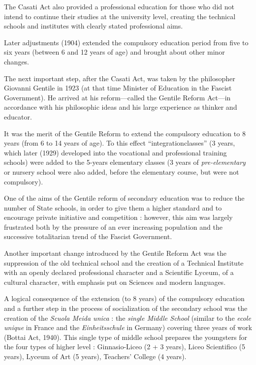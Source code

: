 The Casati Act also provided a professional education for those who did not intend to continue their studies at the university level, creating the technical schools and institutes with clearly stated professional aims.

Later adjustments (1904) extended the compulsory education period from five to six years (between 6 and 12 years of age) and brought about other minor changes.

The next important step, after the Casati Act, was taken by the philosopher Giovanni Gentile in 1923 (at that time Minister of Education in the Fascist Government). He arrived at his reform---called the Gentile Reform Act---in accordance with his philosophic ideas and his large experience as thinker and educator.

It was the merit of the Gentile Reform to extend the compulsory education to 8 years (from 6 to 14 years of age). To this effect ``integration\pageoriginale classes'' (3 years, which later (1929) developed into the vocational and professional training schools) were added to the 5-years elementary classes (3 years of {\em pre-elementary} or nursery school were also added, before the elementary course, but were not compulsory).

One of the aims of the Gentile reform of secondary education was to reduce the number of State schools, in order to give them a higher standard and to encourage private initiative and competition : however, this aim was largely frustrated both by the pressure of an ever increasing population and the successive totalitarian trend of the Fascist Government.

Another important change introduced by the Gentile Reform Act was the suppression of the old technical school and the creation of a Technical Institute with an openly declared professional character and a Scientific Lyceum, of a cultural character, with emphasis put on Sciences and modern languages.

A logical consequence of the extension (to 8 years) of the compulsory education and a further step in the process of socialization of the secondary school was the creation of the {\em Scuola Meida unica} : the {\em single Middle School} (similar to the {\em ecole unique} in France and the {\em Einheitsschule} in Germany) covering three years of work (Bottai Act, 1940). This single type of middle school prepares the youngsters for the four types of higher level : Ginnasio-Liceo (2 + 3 years), Liceo Scientifico (5 years), Lyceum of Art (5 years), Teachers' College (4 years).

